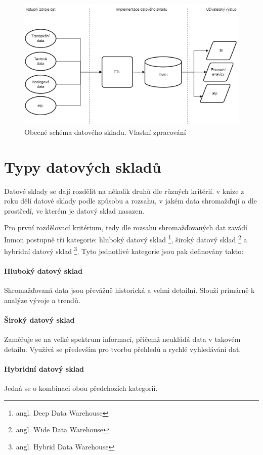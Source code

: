 \documentclass[
  digital,     %
  twoside,     %
  lof,         %
  lot,         %
]{fithesis4}
\begin{document}
\begin{figure}[h]
  \begin{center}
          \includegraphics[width=12cm]{img/dwh_schma.png}
  \end{center}
  \caption{Obecné schéma datového skladu. Vlastní zpracování}
  \label{fig:dwh_schema}
\end{figure}  

\section{Typy datových skladů}
\label{dwh_types}
Datové sklady se dají rozdělit na několik druhů dle různých kritérií. \citeauthor{Inmon2005}
v knize  z roku \citeyear{Inmon2005} dělí datové sklady podle způsobu a rozsahu,
v jakém data shromažďují a dle prostředí, ve kterém je datový sklad nasazen.

Pro první rozdělovací kritérium, tedy dle rozsahu shromažďovaných dat zavádí Inmon postupně tři kategorie: hluboký datový sklad \footnote{angl. Deep Data Warehouse}, široký datový sklad \footnote{angl. Wide Data Warehouse} a hybridní datový sklad \footnote{angl. Hybrid Data Warehouse}. Tyto jednotlivé kategorie jsou pak definovány takto:
\paragraph{Hluboký datový sklad}
Shromažďovaná data jsou převážně historická a velmi detailní. Slouží primárně k analýze vývoje a trendů.
\paragraph{Široký datový sklad}
Zaměřuje se na velké spektrum informací, přičemž neukládá data v takovém detailu. Využívá se především pro tvorbu přehledů a rychlé vyhledávání dat.
\paragraph{Hybridní datový sklad}
Jedná se o kombinaci obou předchozích kategorií.
\end{document}
